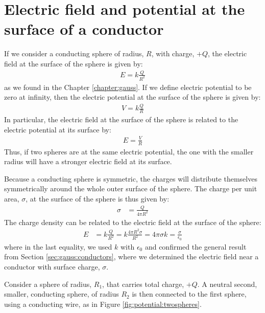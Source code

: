 \section{Electric field and potential at the surface of a conductor}
If we consider a conducting sphere of radius, $R$, with charge, $+Q$, the electric field at the surface of the sphere is given by:
\begin{align*}
E=k\frac{Q}{R^2}
\end{align*}
as we found in the Chapter \ref{chapter:gauss}. If we define electric potential to be zero at infinity, then the electric potential at the surface of the sphere is given by:
\begin{align*}
V=k\frac{Q}{R}
\end{align*}
In particular, the electric field at the surface of the sphere is related to the electric potential at its surface by:
\begin{align*}
E=\frac{V}{R}
\end{align*}
Thus, if two spheres are at the same electric potential, the one with the smaller radius will have a stronger electric field at its surface.

Because a conducting sphere is symmetric, the charges will distribute themselves symmetrically around the whole outer surface of the sphere. The charge per unit area, $\sigma$, at the surface of the sphere is thus given by:
\begin{align*}
\sigma &= \frac{Q}{4\pi R^2}
\end{align*}
The charge density can be related to the electric field at the surface of the sphere:
\begin{align*}
E&=k\frac{Q}{R^2}=k\frac{4\pi R^2\sigma}{R^2}=4\pi\sigma k=\frac{\sigma}{\epsilon_0}
\end{align*}
where in the last equality, we used $k$ with $\epsilon_0$ and confirmed the general result from Section \ref{sec:gauss:conductors}, where we determined the electric field near a conductor with surface charge, $\sigma$. 

Consider a sphere of radius, $R_1$, that carries total charge, $+Q$. A neutral second, smaller, conducting sphere, of radius $R_2$ is then connected to the first sphere, using a conducting wire, as in Figure \ref{fig:potential:twospheres}.

